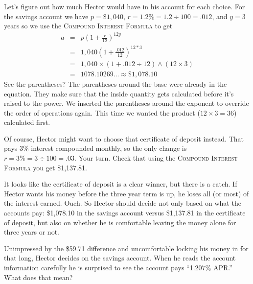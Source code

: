 Let's figure out how much Hector would have in his account for each choice.  For the savings account we have $p=\$1,040$, $r=1.2\% = 1.2 \div 100 = .012$, and $y = 3$ years so we use the \textsc{Compound Interest Formula} to get
\begin{eqnarray*}
a & = &  p \left( 1 + \frac{r}{12}\right) ^{12y}\\
& = &   1,040 \left( 1 + \frac{.012}{12}\right) ^{12\ast 3}\\
& =  &  1,040 \times ( 1 + .012 \div 12 ) \wedge (12 \times 3) \\
& =  & 1078.10269\ldots  \approx \$1,078.10 
\end{eqnarray*}
See the parentheses?  The parentheses around the base were already in the equation.  They make sure that the inside quantity gets calculated before it's raised to the power.  We inserted the parentheses around the exponent to override the order of operations again.  This time we wanted the product ($12 \times 3=36$) calculated first.  

Of course, Hector might want to choose that certificate of deposit instead.  That pays 3\% interest compounded monthly, so the only change is  $r=3\% = 3 \div 100 = .03$.  Your turn.  Check that using the \textsc{Compound Interest Formula} you get \$1,137.81.

It looks like the certificate of deposit is a clear winner, but there is a catch.  If Hector wants his money before the three year term is up, he loses all (or most) of the interest earned. Ouch.  So Hector should decide not only based on what the accounts pay: \$1,078.10 in the savings account versus \$1,137.81 in the certificate of deposit, but also on whether he is comfortable leaving the money alone for three years or not.

Unimpressed by the \$59.71 difference and uncomfortable locking his money in for that long, Hector decides on the savings account. When he reads the account information carefully he is surprised to see the account pays ``1.207\% APR.''  What does that mean?

